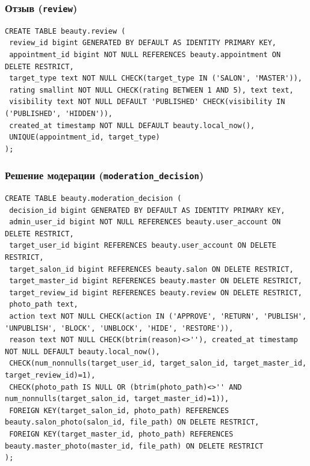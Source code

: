 \documentclass[11pt,a4paper]{article}
\begin{document}
\par\medskip\noindent\begin{minipage}{\linewidth}
\subsubsection*{Отзыв (\texttt{review})}
\begin{lstlisting}[style=sql]
CREATE TABLE beauty.review (
 review_id bigint GENERATED BY DEFAULT AS IDENTITY PRIMARY KEY,
 appointment_id bigint NOT NULL REFERENCES beauty.appointment ON DELETE RESTRICT,
 target_type text NOT NULL CHECK(target_type IN ('SALON', 'MASTER')),
 rating smallint NOT NULL CHECK(rating BETWEEN 1 AND 5), text text,
 visibility text NOT NULL DEFAULT 'PUBLISHED' CHECK(visibility IN ('PUBLISHED', 'HIDDEN')),
 created_at timestamp NOT NULL DEFAULT beauty.local_now(),
 UNIQUE(appointment_id, target_type)
);
\end{lstlisting}
\end{minipage}\par\medskip
\par\medskip\noindent\begin{minipage}{\linewidth}
\subsubsection*{Решение модерации (\texttt{moderation\_\allowbreak{}decision})}
\begin{lstlisting}[style=sql]
CREATE TABLE beauty.moderation_decision (
 decision_id bigint GENERATED BY DEFAULT AS IDENTITY PRIMARY KEY,
 admin_user_id bigint NOT NULL REFERENCES beauty.user_account ON DELETE RESTRICT,
 target_user_id bigint REFERENCES beauty.user_account ON DELETE RESTRICT,
 target_salon_id bigint REFERENCES beauty.salon ON DELETE RESTRICT,
 target_master_id bigint REFERENCES beauty.master ON DELETE RESTRICT,
 target_review_id bigint REFERENCES beauty.review ON DELETE RESTRICT,
 photo_path text,
 action text NOT NULL CHECK(action IN ('APPROVE', 'RETURN', 'PUBLISH', 'UNPUBLISH', 'BLOCK', 'UNBLOCK', 'HIDE', 'RESTORE')),
 reason text NOT NULL CHECK(btrim(reason)<>''), created_at timestamp NOT NULL DEFAULT beauty.local_now(),
 CHECK(num_nonnulls(target_user_id, target_salon_id, target_master_id, target_review_id)=1),
 CHECK(photo_path IS NULL OR (btrim(photo_path)<>'' AND num_nonnulls(target_salon_id, target_master_id)=1)),
 FOREIGN KEY(target_salon_id, photo_path) REFERENCES beauty.salon_photo(salon_id, file_path) ON DELETE RESTRICT,
 FOREIGN KEY(target_master_id, photo_path) REFERENCES beauty.master_photo(master_id, file_path) ON DELETE RESTRICT
);
\end{lstlisting}
\end{minipage}\par\medskip
\end{document}
